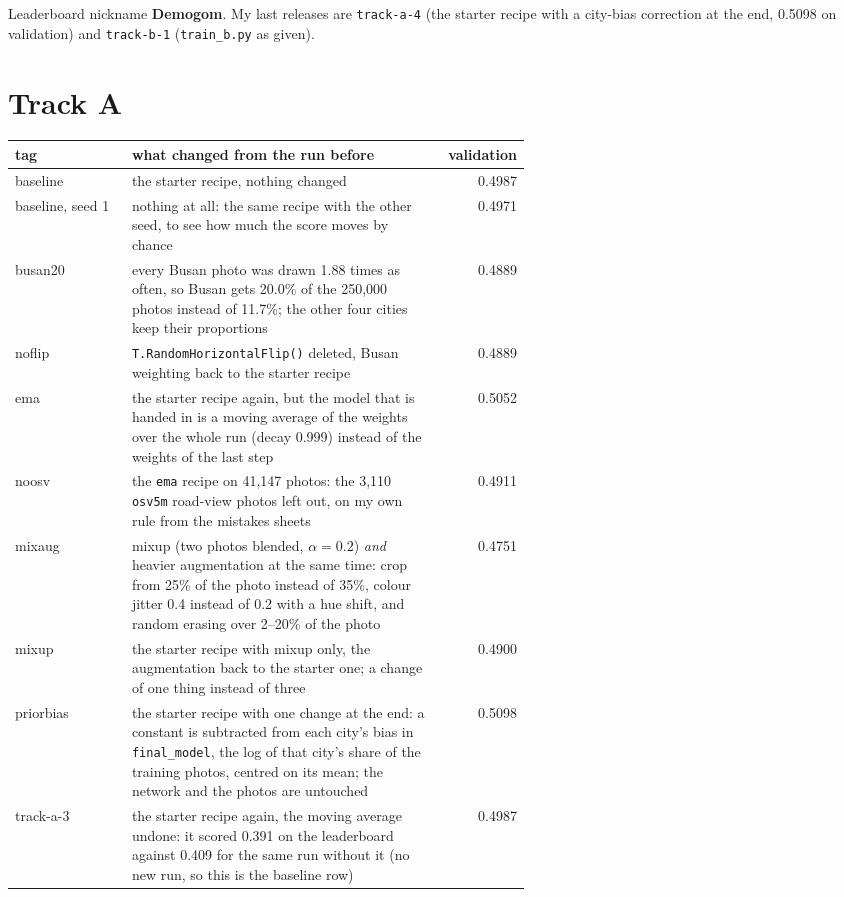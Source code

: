 \documentclass[11pt]{article}
\begin{document}
\makeheader

Leaderboard nickname \textbf{Demogom}. My last releases are \texttt{track-a-4}
(the starter recipe with a city-bias correction at the end, 0.5098 on
validation) and \texttt{track-b-1} (\texttt{train\_b.py} as given).

\section*{Track A}

\begin{center}\footnotesize
\begin{tabular}{lp{0.6\linewidth}r}
\toprule
tag & what changed from the run before & validation \\
\midrule
baseline & the starter recipe, nothing changed & 0.4987 \\
baseline, seed 1 & nothing at all: the same recipe with the other seed, to
see how much the score moves by chance & 0.4971 \\
busan20 & every Busan photo was drawn 1.88 times as often, so Busan gets
20.0\% of the 250,000 photos instead of 11.7\%; the other four cities keep
their proportions & 0.4889 \\
noflip & \texttt{T.RandomHorizontalFlip()} deleted, Busan weighting back to
the starter recipe & 0.4889 \\
ema & the starter recipe again, but the model that is handed in is a moving
average of the weights over the whole run (decay 0.999) instead of the
weights of the last step & 0.5052 \\
noosv & the \texttt{ema} recipe on 41,147 photos: the 3,110 \texttt{osv5m}
road-view photos left out, on my own rule from the mistakes sheets & 0.4911 \\
mixaug & mixup (two photos blended, $\alpha = 0.2$) \emph{and} heavier
augmentation at the same time: crop from 25\% of the photo instead of 35\%,
colour jitter 0.4 instead of 0.2 with a hue shift, and random erasing over
2--20\% of the photo & 0.4751 \\
mixup & the starter recipe with mixup only, the augmentation back to the
starter one; a change of one thing instead of three & 0.4900 \\
priorbias & the starter recipe with one change at the end: a constant is
subtracted from each city's bias in \texttt{final\_model}, the log of that
city's share of the training photos, centred on its mean; the network and the
photos are untouched & 0.5098 \\
track-a-3 & the starter recipe again, the moving average undone: it scored
0.391 on the leaderboard against 0.409 for the same run without it (no new
run, so this is the baseline row) & 0.4987 \\
\bottomrule
\end{tabular}
\end{center}
\end{document}
